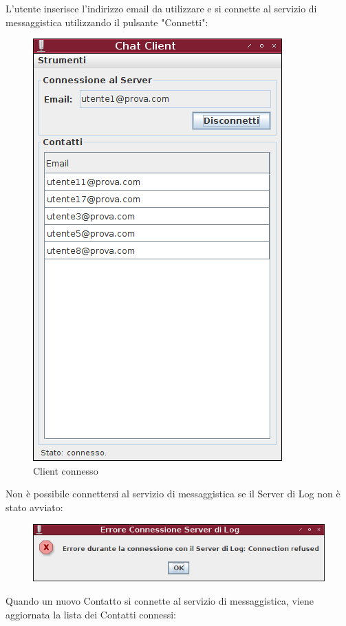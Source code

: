\documentclass[a4paper, 11pt]{article} %
\begin{document}
\clearpage
L'utente inserisce l'indirizzo email da utilizzare e si connette al servizio di messaggistica utilizzando il pulsante "Connetti":
\begin{figure}[H]
\vspace{-0.3cm}
\includegraphics[height=1.2\textwidth]{images/client-2.png}
\vspace{-0.3cm}
\caption{Client connesso}
\end{figure}
\vspace{-0.3cm}
Non \`e possibile connettersi al servizio di messaggistica se il Server di Log non \`e stato avviato:
\begin{figure}[H]
\vspace{-0.3cm}
\includegraphics[width=1.0\textwidth]{images/client-18.png}
\end{figure}
\clearpage
Quando un nuovo Contatto si connette al servizio di messaggistica, viene aggiornata la lista dei Contatti connessi:
\end{document}
